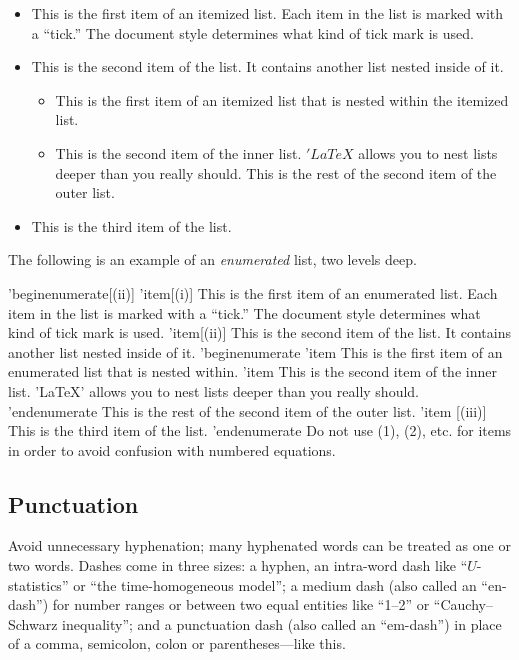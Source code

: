 \documentclass[qe,nameyear,draft]{econsocart}
\theoremstyle{plain}
\begin{document}
\begin{itemize}
\item This is the first item of an itemized list. Each item in the list is marked with a ``tick.'' The document style determines what kind of tick mark is used.
\item This is the second item of the list. It contains another list nested inside of it.

\begin{itemize}
\item This is the first item of an itemized list that is nested within the itemized list.
\item This is the second item of the inner list. $'LaTeX$ allows you to nest lists deeper than you really should.
This is the rest of the second item of the outer list.
\end{itemize}


\item This is the third item of the list.
\end{itemize}

The following is an example of an \textit{enumerated} list, two levels deep.


'begin{enumerate}[(ii)]
'item[(i)]
This is the first item of an enumerated list.  Each item
in the list is marked with a ``tick.''  The document
style determines what kind of tick mark is used.
'item[(ii)]
This is the second item of the list.  It contains another
list nested inside of it.
'begin{enumerate}
'item
This is the first item of an enumerated list that
is nested within.
'item
This is the second item of the inner list.  'LaTeX'
allows you to nest lists deeper than you really should.
'end{enumerate}
This is the rest of the second item of the outer list.
'item [(iii)]
This is the third item of the list.
'end{enumerate}
Do not use (1), (2), etc.  for items in order to avoid confusion with numbered equations.

\subsection{Punctuation}

Avoid unnecessary hyphenation; many hyphenated words can be treated as one or two words.
Dashes come in three sizes: a hyphen, an intra-word dash like ``$U$-statistics'' or ``the time-homogeneous model'';
a medium dash (also called an ``en-dash'') for number ranges or between two equal entities like ``1--2'' or ``Cauchy--Schwarz inequality'';
and a punctuation dash (also called an ``em-dash'') in place of a comma, semicolon,
colon or parentheses---like this.
\end{document}
